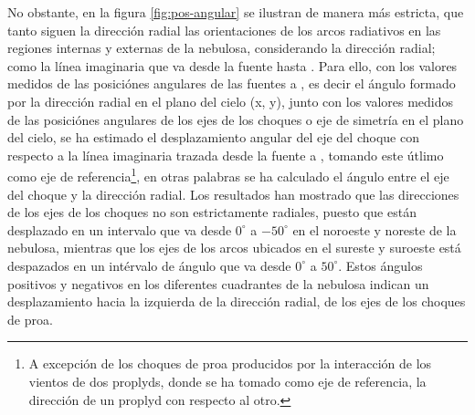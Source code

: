  No obstante, en la figura \ref{fig:pos-angular} se ilustran de manera más estricta, que tanto siguen la dirección radial las orientaciones de los arcos radiativos en las regiones internas y externas  de la nebulosa, considerando la dirección radial; como la línea imaginaria que va desde la fuente hasta \thC{}. Para ello, con los valores medidos de las posiciónes angulares de las fuentes a \thC{}, es decir el ángulo formado por la dirección radial en el plano del cielo (x, y), junto con los valores medidos de las posiciónes angulares de los ejes de los choques o eje de simetría en el plano del cielo, se ha estimado el desplazamiento angular del eje del choque con respecto a la línea imaginaria trazada desde la fuente a \thC{}, tomando este útlimo como eje de referencia\footnote{A excepción de los choques de proa producidos por  la interacción de los vientos de dos proplyds, donde se ha tomado como eje de referencia, la dirección de un proplyd con respecto al otro.}, en otras palabras se ha calculado el ángulo entre el eje del choque y la dirección radial. Los resultados han mostrado que las direcciones de los ejes de los choques no son estrictamente radiales, puesto que están desplazado en un intervalo  que va desde \(0^{\circ}\) a \(-50^{\circ}\) en el noroeste y noreste de la nebulosa, mientras que los ejes de los arcos ubicados en el sureste y suroeste está despazados en un intérvalo de ángulo que va desde \(0^{\circ}\) a \(50^{\circ}\). Estos ángulos positivos y negativos en los diferentes cuadrantes de la nebulosa indican un desplazamiento hacia la izquierda de la dirección radial, de los ejes de los choques de proa. \\

